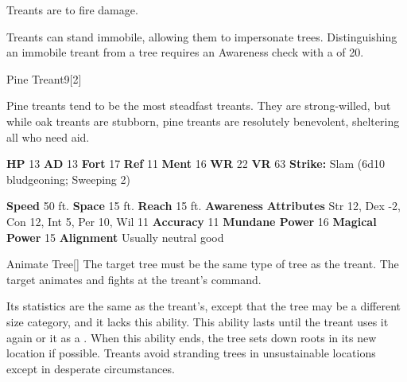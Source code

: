         Treants are  to fire damage.
      
        Treants can stand immobile, allowing them to impersonate trees.
        Distinguishing an immobile treant from a tree requires an Awareness check with a  of 20.
  

  \begin{monsubsection}{Pine Treant}{9}[2]
    \vspace{-1em}\vspace{-1em}
    \vspace{0em}

    
           Pine treants tend to be the most steadfast treants.
           They are strong-willed, but while oak treants are stubborn, pine treants are resolutely benevolent, sheltering all who need aid.
        

    \begin{spellcontent}
      \begin{spelltargetinginfo}
        \pari \textbf{HP} 13 \monsep
          \textbf{AD} 13 \monsep
          \textbf{Fort} 17 \monsep
          \textbf{Ref} 11 \monsep
          \textbf{Ment} 16
        \pari \textbf{WR} 22 \monsep
        \textbf{VR} 63
        \pari \textbf{Strike:}
            Slam  (6d10 bludgeoning; Sweeping 2)
      \end{spelltargetinginfo}
    \end{spellcontent}
    \begin{monsterfooter}
      \pari \textbf{Speed} 50 ft. \monsep
        \textbf{Space} 15 ft. \monsep
        \textbf{Reach} 15 ft.
      \pari \textbf{Awareness} 
      \pari \textbf{Attributes}
        Str 12, Dex -2,
        Con 12, Int 5,
        Per 10, Wil 11
      \pari \textbf{Accuracy} 11 \monsep
        \textbf{Mundane Power} 16 \monsep
      \textbf{Magical Power} 15
      \pari \textbf{Alignment} Usually neutral good
    \end{monsterfooter}
  \end{monsubsection}
  \begin{freeability}{Animate Tree}[]
      The target tree must be the same type of tree as the treant.
        The target animates and fights at the treant's command.

        Its statistics are the same as the treant's, except that the tree may be a different size category, and it lacks this ability.
        This ability lasts until the treant uses it again or  it as a .
        When this ability ends, the tree sets down roots in its new location if possible.
        Treants avoid stranding trees in unsustainable locations except in desperate circumstances.
    \end{freeability}
  

